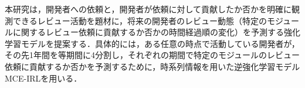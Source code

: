 \documentclass[submit,noauthor,ses,dvipdfmx]{ipsj}
\newcommand{\todo}[1]{\colorbox{yellow}{{\bf TODO}:}{\color{red} {\textbf{[#1]}}}}
\begin{document}

本研究は，開発者への依頼と，開発者が依頼に対して貢献したか否かを明確に観測できるレビュー活動を題材に，将来の開発者のレビュー動態（特定のモジュールに関するレビュー依頼に貢献するか否かの時間経過順の変化）を予測する強化学習モデルを提案する．具体的には，ある任意の時点で活動している開発者が，その先1年間を等期間に4分割し，それぞれの期間で特定のモジュールのレビュー依頼に貢献するか否かを予測するために，時系列情報を用いた逆強化学習モデルMCE-IRLを用いる．






\end{document}

